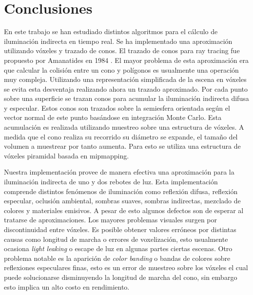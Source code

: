 \chapter{Conclusiones}
\label{chap:conclusion}
En este trabajo se han estudiado distintos algoritmos para el cálculo de iluminación indirecta en tiempo real. Se ha implementado una aproximación utilizando vóxeles y trazado de conos. El trazado de conos para ray tracing fue propuesto por Amanatides en 1984 \cite{Amanatides:1984:RTC:800031.808589}. El mayor problema de esta aproximación era que calcular la colisión entre un cono y polígonos es usualmente una operación muy compleja. Utilizando una representación simplificada de la escena en vóxeles se evita esta desventaja realizando ahora un trazado aproximado. Por cada punto sobre una superficie se trazan conos para acumular la iluminación indirecta difusa y especular. Estos conos son trazados sobre la semiesfera orientada según el vector normal de este punto basándose en integración Monte Carlo. Esta acumulación es realizada utilizando muestreo sobre una estructura de vóxeles. A medida que el cono realiza su recorrido su diámetro se expande, el tamaño del volumen a muestrear por tanto aumenta. Para esto se utiliza una estructura de vóxeles piramidal basada en mipmapping.

Nuestra implementación provee de manera efectiva una aproximación para la iluminación indirecta de uno y dos rebotes de luz. Esta implementación comprende distintos fenómenos de iluminación como reflexión difusa, reflexión especular, oclusión ambiental, sombras suaves, sombras indirectas, mezclado de colores y materiales emisivos. A pesar de esto algunos defectos son de esperar al tratarse de aproximaciones. Los mayores problemas visuales surgen por discontinuidad entre vóxeles. Es posible obtener valores erróneos por distintas causas como longitud de marcha o errores de voxelización, esto usualmente ocasiona \emph{light leaking} o escape de luz en algunas partes ciertas escenas. Otro problema notable es la aparición de \emph{color banding} o bandas de colores sobre reflexiones especulares finas, esto es un error de muestreo sobre los vóxeles el cual puede solucionarse disminuyendo la longitud de marcha del cono, sin embargo esto implica un alto costo en rendimiento.

